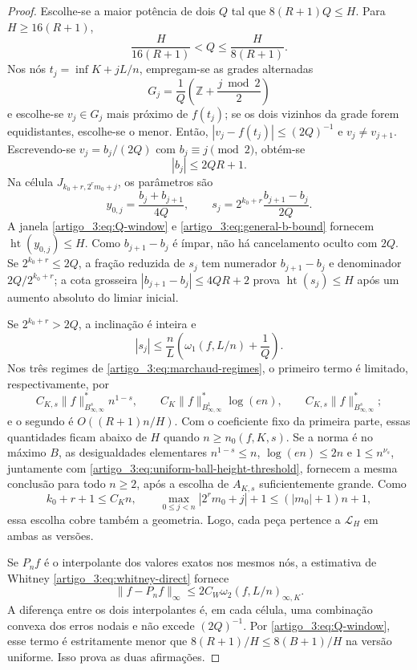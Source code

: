 \documentclass[12pt,a4paper]{article}
\theoremstyle{preciso}
\theoremstyle{definition}
\newcommand{\Library}{\mathcal{L}}
\newcommand{\height}{\operatorname{ht}}
\theoremstyle{preciso}
\theoremstyle{preciso}
\theoremstyle{preciso}
\theoremstyle{preciso}
\theoremstyle{definition}
\theoremstyle{preciso}
\theoremstyle{definition}
\theoremstyle{preciso}
\theoremstyle{preciso}
\theoremstyle{definition}
\begin{document}
\begin{proof}
Escolhe-se a maior potência de dois $Q$ tal que
$8(R+1)Q\le H$. Para $H\ge16(R+1)$,
\begin{equation}
 \frac{H}{16(R+1)}<Q\le\frac{H}{8(R+1)}.
 \label{artigo_3:eq:Q-window}
\end{equation}
Nos nós $t_j=\inf K+jL/n$, empregam-se as grades alternadas
\[
 G_j=\frac1Q\left(\mathbb Z+\frac{j\bmod2}{2}\right)
\]
e escolhe-se $v_j\in G_j$ mais próximo de $f(t_j)$; se os dois vizinhos da grade
forem equidistantes, escolhe-se o menor. Então,
$|v_j-f(t_j)|\le(2Q)^{-1}$ e $v_j\ne v_{j+1}$. Escrevendo-se
$v_j=b_j/(2Q)$ com $b_j\equiv j\pmod2$, obtém-se
\begin{equation}
 |b_j|\le2QR+1.
 \label{artigo_3:eq:general-b-bound}
\end{equation}
Na célula $J_{k_0+r,2^rm_0+j}$, os parâmetros são
\begin{equation}
 y_{0,j}=\frac{b_j+b_{j+1}}{4Q},
 \qquad
 s_j=2^{k_0+r}\frac{b_{j+1}-b_j}{2Q}.
 \label{artigo_3:eq:general-atom-parameters}
\end{equation}
A janela \eqref{artigo_3:eq:Q-window} e \eqref{artigo_3:eq:general-b-bound} fornecem
$\height(y_{0,j})\le H$. Como $b_{j+1}-b_j$ é ímpar, não há cancelamento
oculto com $2Q$. Se $2^{k_0+r}\le2Q$, a fração reduzida de $s_j$ tem
numerador $b_{j+1}-b_j$ e denominador $2Q/2^{k_0+r}$; a cota grosseira
$|b_{j+1}-b_j|\le4QR+2$ prova $\height(s_j)\le H$ após um aumento absoluto
do limiar inicial.

Se $2^{k_0+r}>2Q$, a inclinação é inteira e
\begin{equation}
 |s_j|
 \le \frac nL\left(\omega_1(f,L/n)+\frac1Q\right).
 \label{artigo_3:eq:slope-marchaud-bound}
\end{equation}
Nos três regimes de \eqref{artigo_3:eq:marchaud-regimes}, o primeiro termo é limitado,
respectivamente, por
\[
 C_{K,s}\|f\|_{B^s_{\infty,\infty}}^*n^{1-s},\qquad
 C_{K}\|f\|_{B^1_{\infty,\infty}}^*\log(en),\qquad
 C_{K,s}\|f\|_{B^s_{\infty,\infty}}^*;
\]
e o segundo é $O((R+1)n/H)$. Com o coeficiente fixo da primeira parte, essas
quantidades ficam abaixo de $H$ quando $n\ge n_0(f,K,s)$. Se a norma é no
máximo $B$, as desigualdades elementares
$n^{1-s}\le n$, $\log(en)\le2n$ e $1\le n^{\nu_s}$, juntamente com
\eqref{artigo_3:eq:uniform-ball-height-threshold}, fornecem a mesma conclusão para todo
$n\ge2$, após a escolha de $A_{K,s}$ suficientemente grande. Como
\[
 k_0+r+1\le C_Kn,\qquad
 \max_{0\le j<n}|2^rm_0+j|+1\le(|m_0|+1)n+1,
\]
essa escolha cobre também a geometria. Logo, cada peça pertence a
$\Library_H$ em ambas as versões.

Se $P_nf$ é o interpolante dos valores exatos nos mesmos nós, a estimativa
de Whitney \eqref{artigo_3:eq:whitney-direct} fornece
\[
 \|f-P_nf\|_\infty
 \le2C_W\omega_2(f,L/n)_{\infty,K}.
\]
A diferença entre os dois interpolantes é, em cada célula, uma combinação
convexa dos erros nodais e não excede $(2Q)^{-1}$. Por \eqref{artigo_3:eq:Q-window},
esse termo é estritamente menor que
$8(R+1)/H\le8(B+1)/H$ na versão uniforme. Isso prova as duas afirmações.
\end{proof}
\end{document}
